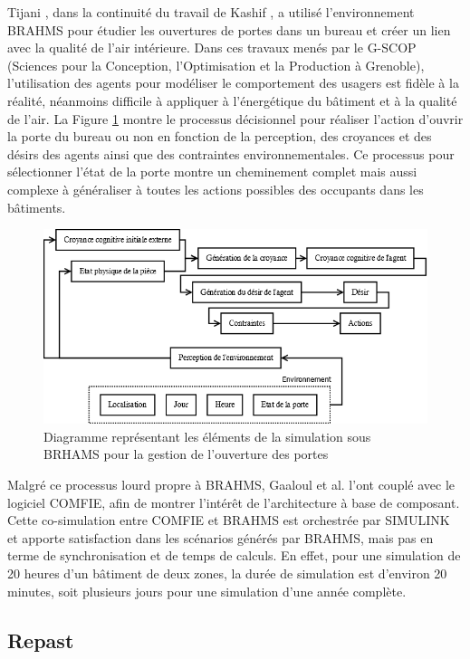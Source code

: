Tijani \cite{Tijani-14}, dans la continuité du travail de Kashif \cite{Kashif-13}, a utilisé l'environnement BRAHMS pour étudier les ouvertures de portes dans un bureau et créer un lien avec la qualité de l'air intérieure. Dans ces travaux menés par le G-SCOP (Sciences pour la Conception, l'Optimisation et la Production à Grenoble), l'utilisation des agents pour modéliser le comportement des usagers est fidèle à la réalité, néanmoins difficile à appliquer à l'énergétique du bâtiment et à la qualité de l'air. La Figure \ref{fig:Diagramme_BRAHMS} montre le processus décisionnel pour réaliser l'action d'ouvrir la porte du bureau ou non en fonction de la perception, des croyances et des désirs des agents ainsi que des contraintes environnementales. Ce processus pour sélectionner l'état de la porte montre un cheminement complet mais aussi complexe à généraliser à toutes les actions possibles des occupants dans les bâtiments. 

\begin{figure}[H]
\centering
\includegraphics[scale=0.4]{Images/diagrammes_SMA/BRAHMS}
\caption{Diagramme représentant les éléments de la simulation sous BRHAMS pour la gestion de l'ouverture des portes}
\label{fig:Diagramme_BRAHMS}
\end{figure}

Malgré ce processus lourd propre à BRAHMS, Gaaloul et al. \cite{Gaaloul-12} l'ont couplé avec le logiciel COMFIE, afin de montrer l'intérêt de l'architecture à base de composant. Cette co-simulation entre COMFIE et BRAHMS est orchestrée par SIMULINK et apporte satisfaction dans les scénarios générés par BRAHMS, mais pas en terme de synchronisation et de temps de calculs. En effet, pour une simulation de 20 heures d'un bâtiment de deux zones, la durée de simulation est d'environ 20 minutes, soit plusieurs jours pour une simulation d'une année complète. 

\subsection{Repast}

